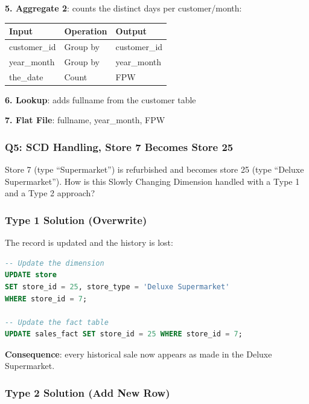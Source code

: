 \textbf{5. Aggregate 2}: counts the distinct days per customer/month:
\begin{center}
\scriptsize
\begin{tabular}{@{}lll@{}}
\toprule
\textbf{Input} & \textbf{Operation} & \textbf{Output} \\
\midrule
customer\_id & Group by & customer\_id \\
year\_month & Group by & year\_month \\
the\_date & Count & FPW \\
\bottomrule
\end{tabular}
\end{center}

\textbf{6. Lookup}: adds fullname from the customer table

\textbf{7. Flat File}: fullname, year\_month, FPW

\subsubsection{Q5: SCD Handling, Store 7 Becomes Store 25}
\label{subsec:ex-q5}

\begin{theorybox}[frametitle={Exercise}]
Store 7 (type ``Supermarket'') is refurbished and becomes store 25 (type ``Deluxe Supermarket''). How is this Slowly Changing Dimension handled with a Type 1 and a Type 2 approach?
\end{theorybox}

\subsubsection*{Type 1 Solution (Overwrite)}

The record is updated and the history is lost:
\begin{lstlisting}[language=SQL]
-- Update the dimension
UPDATE store
SET store_id = 25, store_type = 'Deluxe Supermarket'
WHERE store_id = 7;

-- Update the fact table
UPDATE sales_fact SET store_id = 25 WHERE store_id = 7;
\end{lstlisting}

\textbf{Consequence}: every historical sale now appears as made in the Deluxe Supermarket.

\subsubsection*{Type 2 Solution (Add New Row)}

